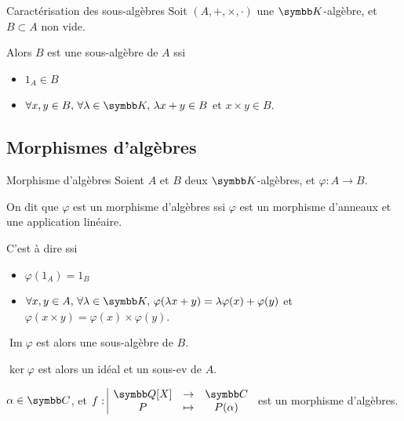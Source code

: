 \begin{proposition}{Caractérisation des sous-algèbres}{}
    Soit $(A, +, \times, \cdot)$ une $\K$-algèbre, et $B \subset A$ non vide. 

    Alors $B$ est une sous-algèbre de $A$ ssi 
    \begin{itemize}
        \item $1_A \in B$
        \item $\forall x, y \in B, \, \forall \lambda \in \K, \, \lambda x + y \in B$ et $x \times y \in B$.
    \end{itemize}
\end{proposition}

\subsection{Morphismes d'algèbres}

\begin{definition}{Morphisme d'algèbres}{}
    Soient $A$ et $B$ deux $\K$-algèbres, et $\varphi : A \to B$.

    On dit que $\varphi$ est un morphisme d'algèbres ssi $\varphi$ est un 
    morphisme d'anneaux et une application linéaire.

    C'est à dire ssi 
    \begin{itemize}
        \item $\varphi(1_A) = 1_B$
        \item $\forall x, y \in A, \, \forall \lambda \in \K, \, \varphi(\lambda x + y) = \lambda \varphi(x) + \varphi(y)$
        et $\varphi(x \times y) = \varphi(x) \times \varphi(y)$.
    \end{itemize}
\end{definition}

\begin{remarque}
    $\operatorname{Im} \varphi$ est alors une sous-algèbre de $B$.

    $\ker \varphi$ est alors un idéal et un sous-ev de $A$.
\end{remarque}

\begin{exemple}
    $\alpha \in \C$, et $\fonction f {\Q[X]} \C P {P(\alpha)}$ est un morphisme d'algèbres.
\end{exemple}
